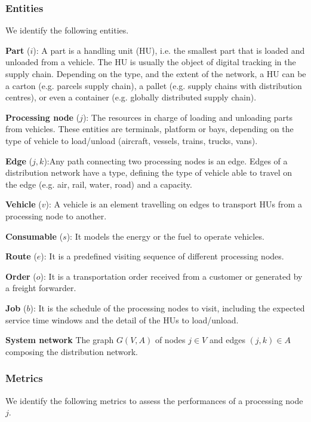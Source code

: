 \subsubsection{Entities}
We identify the following entities.\par
\textbf{Part} ($i$): A part is a handling unit (HU), i.e. the smallest part that is loaded and unloaded from a vehicle. The HU is usually the object of digital tracking in the supply chain. Depending on the type, and the extent of the network, a HU can be a carton (e.g. parcels supply chain), a pallet (e.g. supply chains with distribution centres), or even a container (e.g. globally distributed supply chain). \par

\textbf{Processing node} ($j$): The resources in charge of loading and unloading parts from vehicles. These entities are terminals, platform or bays, depending on the type of vehicle to load/unload (aircraft, vessels, trains, trucks, vans). \par

\textbf{Edge} ($j,k$):Any path connecting two processing nodes is an edge. Edges of a distribution network have a type, defining the type of vehicle able to travel on the edge (e.g. air, rail, water, road) and a capacity. \par

\textbf{Vehicle} ($v$): A vehicle is an element travelling on edges to transport HUs from a processing node to another. \par

\textbf{Consumable} ($s$): It models the energy or the fuel to operate vehicles. \par

\textbf{Route} ($e$): It is a predefined visiting sequence of different processing nodes. \par

\textbf{Order} ($o$): It is a transportation order received from a customer or generated by a freight forwarder. \par

\textbf{Job} ($b$): It is the schedule of the processing nodes to visit, including the expected service time windows and the detail of the HUs to load/unload. \par

\textbf{System network} The graph $G(V,A)$ of nodes $j\in V$ and edges $\left(j,k\right)\in A$ composing the distribution network.

\subsubsection{Metrics}
We identify the following metrics to assess the performances of a processing node $j$.\par

